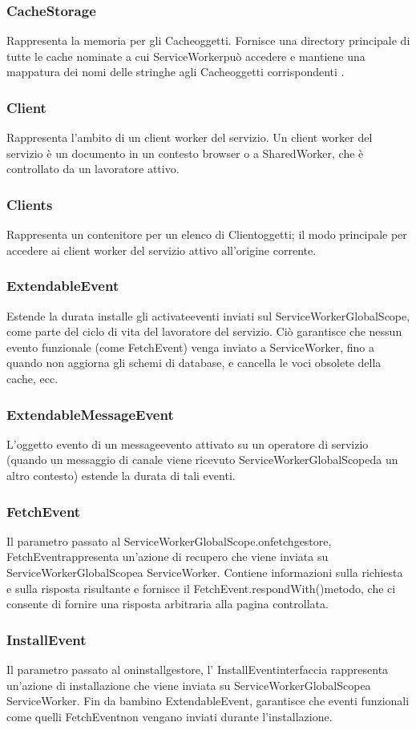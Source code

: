 \documentclass[italian]{article}
\begin{document}
\subsubsection{CacheStorage}
Rappresenta la memoria per gli Cacheoggetti. Fornisce una directory principale di tutte le cache nominate a cui ServiceWorkerpuò accedere e mantiene una mappatura dei nomi delle stringhe agli Cacheoggetti corrispondenti .
\subsubsection{Client}
Rappresenta l'ambito di un client worker del servizio. Un client worker del servizio è un documento in un contesto browser o a SharedWorker, che è controllato da un lavoratore attivo.
\subsubsection{Clients}
Rappresenta un contenitore per un elenco di Clientoggetti; il modo principale per accedere ai client worker del servizio attivo all'origine corrente.
\subsubsection{ExtendableEvent}
Estende la durata installe gli activateeventi inviati sul ServiceWorkerGlobalScope, come parte del ciclo di vita del lavoratore del servizio. Ciò garantisce che nessun evento funzionale (come FetchEvent) venga inviato a ServiceWorker, fino a quando non aggiorna gli schemi di database, e cancella le voci obsolete della cache, ecc.
\subsubsection{ExtendableMessageEvent}
L'oggetto evento di un messageevento attivato su un operatore di servizio (quando un messaggio di canale viene ricevuto ServiceWorkerGlobalScopeda un altro contesto) estende la durata di tali eventi.
\subsubsection{FetchEvent}
Il parametro passato al ServiceWorkerGlobalScope.onfetchgestore, FetchEventrappresenta un'azione di recupero che viene inviata su ServiceWorkerGlobalScopea ServiceWorker. Contiene informazioni sulla richiesta e sulla risposta risultante e fornisce il FetchEvent.respondWith()metodo, che ci consente di fornire una risposta arbitraria alla pagina controllata.
\subsubsection{InstallEvent}
Il parametro passato al oninstallgestore, l' InstallEventinterfaccia rappresenta un'azione di installazione che viene inviata su ServiceWorkerGlobalScopea ServiceWorker. Fin da bambino ExtendableEvent, garantisce che eventi funzionali come quelli FetchEventnon vengano inviati durante l'installazione.
\end{document}
